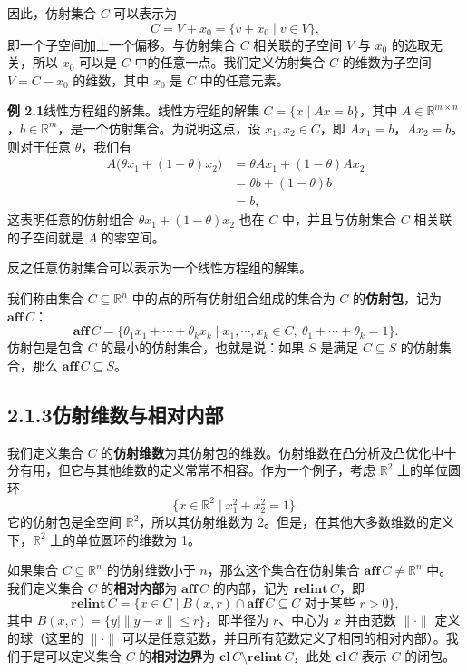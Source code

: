 \documentclass[UTF8, 12pt, fontset=fandol, oneside]{ctexart}
\begin{document}
因此，仿射集合 $C$ 可以表示为
\[
  C=V+x_0=\{v+x_0\mid v\in V\},
\]
即一个子空间加上一个偏移。与仿射集合 $C$ 相关联的子空间 $V$ 与 $x_0$ 的选取无关，所以 $x_0$ 可以是 $C$ 中的任意一点。我们定义仿射集合 $C$ 的维数为子空间 $V=C-x_0$ 的维数，其中 $x_0$ 是 $C$ 中的任意元素。

\noindent\textbf{例 2.1}\quad 线性方程组的解集。线性方程组的解集 $C=\{x\mid Ax=b\}$，其中 $A\in\mathbb{R}^{m\times n}$，$b\in\mathbb{R}^m$，是一个仿射集合。为说明这点，设 $x_1,x_2\in C$，即 $Ax_1=b$，$Ax_2=b$。则对于任意 $\theta$，我们有
\[
\begin{aligned}
  A\bigl(\theta x_1+(1-\theta)x_2\bigr)
  &=\theta Ax_1+(1-\theta)Ax_2\\
  &=\theta b+(1-\theta)b\\
  &=b,
\end{aligned}
\]
这表明任意的仿射组合 $\theta x_1+(1-\theta)x_2$ 也在 $C$ 中，并且与仿射集合 $C$ 相关联的子空间就是 $A$ 的零空间。

反之任意仿射集合可以表示为一个线性方程组的解集。

我们称由集合 $C\subseteq\mathbb{R}^n$ 中的点的所有仿射组合组成的集合为 $C$ 的\textbf{仿射包}，记为 $\mathbf{aff}\,C$：
\[
  \mathbf{aff}\,C=\{\theta_1x_1+\cdots+\theta_kx_k\mid x_1,\cdots,x_k\in C,\ \theta_1+\cdots+\theta_k=1\}.
\]
仿射包是包含 $C$ 的最小的仿射集合，也就是说：如果 $S$ 是满足 $C\subseteq S$ 的仿射集合，那么 $\mathbf{aff}\,C\subseteq S$。

\subsection*{2.1.3\quad 仿射维数与相对内部}

我们定义集合 $C$ 的\textbf{仿射维数}为其仿射包的维数。仿射维数在凸分析及凸优化中十分有用，但它与其他维数的定义常常不相容。作为一个例子，考虑 $\mathbb{R}^2$ 上的单位圆环
\[
  \{x\in\mathbb{R}^2\mid x_1^2+x_2^2=1\}.
\]
它的仿射包是全空间 $\mathbb{R}^2$，所以其仿射维数为 2。但是，在其他大多数维数的定义下，$\mathbb{R}^2$ 上的单位圆环的维数为 1。

如果集合 $C\subseteq\mathbb{R}^n$ 的仿射维数小于 $n$，那么这个集合在仿射集合 $\mathbf{aff}\,C\ne\mathbb{R}^n$ 中。我们定义集合 $C$ 的\textbf{相对内部}为 $\mathbf{aff}\,C$ 的内部，记为 $\mathbf{relint}\,C$，即
\[
  \mathbf{relint}\,C=\{x\in C\mid B(x,r)\cap \mathbf{aff}\,C\subseteq C\text{ 对于某些 }r>0\},
\]
其中 $B(x,r)=\{y\mid \|y-x\|\le r\}$，即半径为 $r$、中心为 $x$ 并由范数 $\|\cdot\|$ 定义的球（这里的 $\|\cdot\|$ 可以是任意范数，并且所有范数定义了相同的相对内部）。我们于是可以定义集合 $C$ 的\textbf{相对边界}为 $\mathbf{cl}\,C\setminus\mathbf{relint}\,C$，此处 $\mathbf{cl}\,C$ 表示 $C$ 的闭包。
\end{document}
